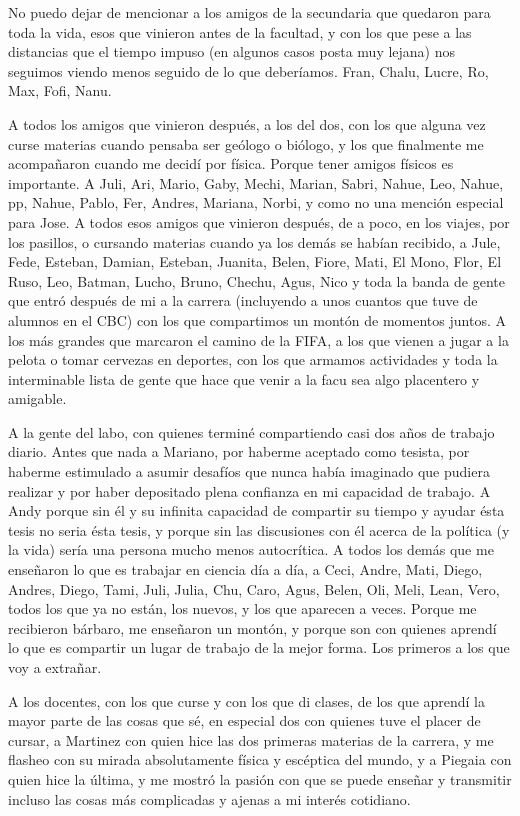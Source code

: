 \documentclass{article}
\numberwithin{figure}{section}
\begin{document}
    No puedo dejar de mencionar a los amigos de la secundaria que quedaron para toda la vida, esos que vinieron antes de la facultad, y con los que pese a las distancias que el tiempo impuso (en algunos casos posta muy lejana) nos seguimos viendo menos seguido de lo que deberíamos. Fran, Chalu, Lucre, Ro, Max, Fofi, Nanu. 
    
    A todos los amigos que vinieron después, a los del dos, con los que alguna vez curse materias cuando pensaba ser geólogo o biólogo, y los que finalmente me acompañaron cuando me decidí por física. Porque tener amigos físicos es importante. A Juli, Ari, Mario, Gaby, Mechi, Marian, Sabri, Nahue, Leo, Nahue, pp, Nahue, Pablo, Fer, Andres, Mariana, Norbi, y como no una mención especial para Jose. A todos esos amigos que vinieron después, de a poco, en los viajes, por los pasillos, o cursando materias cuando ya los demás se habían recibido, a Jule, Fede, Esteban, Damian, Esteban, Juanita, Belen, Fiore, Mati, El Mono, Flor, El Ruso, Leo, Batman, Lucho, Bruno, Chechu, Agus, Nico y toda la banda de gente que entró después de mi a la carrera (incluyendo a unos cuantos que tuve de alumnos en el CBC) con los que compartimos un montón de momentos juntos. A los más grandes que marcaron el camino de la FIFA, a los que vienen a jugar a la pelota o tomar cervezas en deportes, con los que armamos actividades y toda la interminable lista de gente que hace que venir a la facu sea algo placentero y amigable. 
    
    A la gente del labo, con quienes terminé compartiendo casi dos años de trabajo diario. Antes que nada a Mariano, por haberme aceptado como tesista, por haberme estimulado a asumir desafíos que nunca había imaginado que pudiera realizar y por haber depositado plena confianza en mi capacidad de trabajo. A Andy porque sin él y su infinita capacidad de compartir su tiempo y ayudar ésta tesis no seria ésta tesis, y porque sin las discusiones con él acerca de la política (y la vida) sería una persona mucho menos autocrítica. A todos los demás que me enseñaron lo que es trabajar en ciencia día a día, a Ceci, Andre, Mati, Diego, Andres, Diego, Tami, Juli, Julia, Chu, Caro, Agus, Belen, Oli, Meli, Lean, Vero, todos los que ya no están, los nuevos, y los que aparecen a veces. Porque me recibieron bárbaro, me enseñaron un montón, y porque son con quienes aprendí lo que es compartir un lugar de trabajo de la mejor forma. Los primeros a los que voy a extrañar.
    
    A los docentes, con los que curse y con los que di clases, de los que aprendí la mayor parte de las cosas que sé, en especial dos con quienes tuve el placer de cursar, a Martinez con quien hice las dos primeras materias de la carrera, y me flasheo con su mirada absolutamente física y escéptica del mundo, y a Piegaia con quien hice la última, y me mostró la pasión con que se puede enseñar y transmitir incluso las cosas más complicadas y ajenas a mi interés cotidiano.
\end{document}
